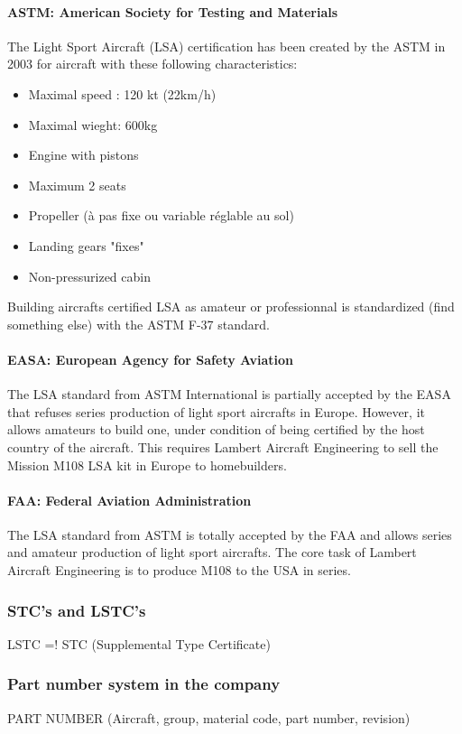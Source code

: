\documentclass[11pt,a4paper]{report}
\begin{document}
\paragraph{ASTM: American Society for Testing and Materials}
The Light Sport Aircraft (LSA) certification has been created by the ASTM in 2003 for aircraft with these following characteristics:
\begin{itemize}
\item Maximal speed : 120 kt (22km/h)
\item Maximal wieght: 600kg
\item Engine with pistons
\item Maximum 2 seats
\item Propeller (à pas fixe ou variable réglable au sol)
\item Landing gears "fixes"
\item Non-pressurized cabin
\end{itemize}

\bigskip

Building aircrafts certified LSA as amateur or professionnal is standardized (find something else) with the ASTM F-37 standard.

\paragraph{EASA: European Agency for Safety Aviation}
The LSA standard from ASTM International is partially accepted by the EASA that refuses series production of light sport aircrafts in Europe. However, it allows amateurs to build one, under condition of being certified by the host country of the aircraft. This requires Lambert Aircraft Engineering to sell the Mission M108 LSA kit in Europe to homebuilders.

\paragraph{FAA: Federal Aviation Administration}
The LSA standard from ASTM is totally accepted by the FAA and allows series and amateur production of light sport aircrafts. The core task of Lambert Aircraft Engineering is to produce M108 to the USA in series.

\subsubsection{STC's and LSTC's}
LSTC =! STC (Supplemental Type Certificate)

\subsubsection{Part number system in the company} %
PART NUMBER (Aircraft, group, material code, part number, revision)
\end{document}
